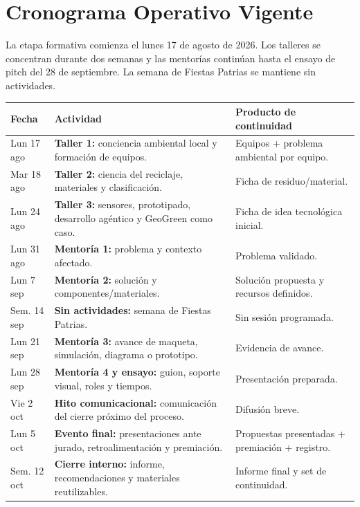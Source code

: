 \documentclass[10pt,letterpaper]{article}
\begin{document}
\newpage

\section{Cronograma Operativo Vigente}

La etapa formativa comienza el lunes 17 de agosto de 2026. Los talleres se concentran durante dos semanas y las mentorías continúan hasta el ensayo de pitch del 28 de septiembre. La semana de Fiestas Patrias se mantiene sin actividades.

\begin{tabularx}{\textwidth}{L{2.6cm}Y L{4.1cm}}
\hline
\textbf{Fecha} & \textbf{Actividad} & \textbf{Producto de continuidad} \\
\hline
Lun 17 ago & \textbf{Taller 1:} conciencia ambiental local y formación de equipos. & Equipos + problema ambiental por equipo. \\
\hline
Mar 18 ago & \textbf{Taller 2:} ciencia del reciclaje, materiales y clasificación. & Ficha de residuo/material. \\
\hline
Lun 24 ago & \textbf{Taller 3:} sensores, prototipado, desarrollo agéntico y GeoGreen como caso. & Ficha de idea tecnológica inicial. \\
\hline
Lun 31 ago & \textbf{Mentoría 1:} problema y contexto afectado. & Problema validado. \\
\hline
Lun 7 sep & \textbf{Mentoría 2:} solución y componentes/materiales. & Solución propuesta y recursos definidos. \\
\hline
Sem. 14 sep & \textbf{Sin actividades:} semana de Fiestas Patrias. & Sin sesión programada. \\
\hline
Lun 21 sep & \textbf{Mentoría 3:} avance de maqueta, simulación, diagrama o prototipo. & Evidencia de avance. \\
\hline
Lun 28 sep & \textbf{Mentoría 4 y ensayo:} guion, soporte visual, roles y tiempos. & Presentación preparada. \\
\hline
Vie 2 oct & \textbf{Hito comunicacional:} comunicación del cierre próximo del proceso. & Difusión breve. \\
\hline
Lun 5 oct & \textbf{Evento final:} presentaciones ante jurado, retroalimentación y premiación. & Propuestas presentadas + premiación + registro. \\
\hline
Sem. 12 oct & \textbf{Cierre interno:} informe, recomendaciones y materiales reutilizables. & Informe final y set de continuidad. \\
\hline
\end{tabularx}
\end{document}
